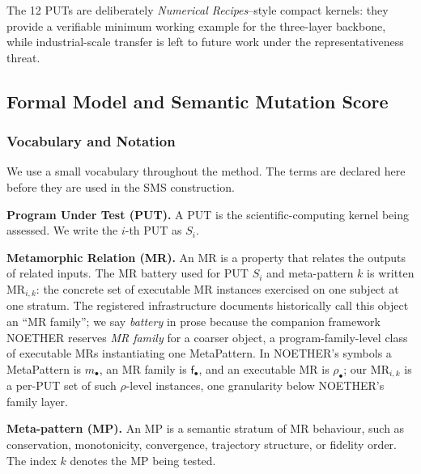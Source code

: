 \documentclass[manuscript,screen,review]{acmart}
\begin{document}
The 12 PUTs are deliberately \emph{Numerical Recipes}--style compact
kernels: they provide a verifiable minimum working example for the
three-layer backbone, while industrial-scale transfer is left to future
work under the representativeness threat.


\subsection{Formal Model and Semantic Mutation Score}\label{notation-and-equivalence-judgement}

\subsubsection{Vocabulary and Notation}\label{vocabulary-inheritance}

We use a small vocabulary throughout the method. The terms are declared
here before they are used in the SMS construction.

\textbf{Program Under Test (PUT).} A PUT is the scientific-computing
kernel being assessed. We write the \(i\)-th PUT as \(S_i\).

\textbf{Metamorphic Relation (MR).} An MR is a property that relates the
outputs of related inputs. The MR battery used for PUT \(S_i\) and
meta-pattern \(k\) is written \(\mathrm{MR}_{i,k}\): the concrete set of
executable MR instances exercised on one subject at one stratum. The
registered infrastructure documents historically call this object an
``MR family''; we say \emph{battery} in prose because the companion
framework NOETHER \citep{noether2026} reserves \emph{MR family} for a
coarser object, a program-family-level class of executable MRs
instantiating one MetaPattern. In NOETHER's symbols a MetaPattern is
\(m_{\bullet}\), an MR family is \(\mathsf{f}_{\bullet}\), and an
executable MR is \(\rho_{\bullet}\); our \(\mathrm{MR}_{i,k}\) is a
per-PUT set of such \(\rho\)-level instances, one granularity below
NOETHER's family layer.

\textbf{Meta-pattern (MP).} An MP is a semantic stratum of MR behaviour,
such as conservation, monotonicity, convergence, trajectory structure, or
fidelity order. The index \(k\) denotes the MP being tested.
\end{document}
